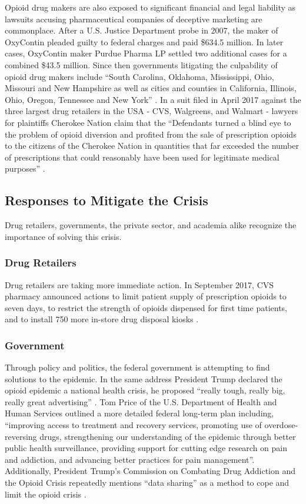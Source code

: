 \documentclass[sigconf]{acmart}
\begin{document}
Opioid drug makers are also exposed to significant financial and legal liability as lawsuits accusing pharmaceutical companies of deceptive marketing are commonplace. After a U.S. Justice Department probe in 2007, the maker of OxyContin pleaded guilty to federal charges and paid \$634.5 million. In later cases, OxyContin maker Purdue Pharma LP settled two additional cases for a combined \$43.5 million. Since then governments litigating the culpability of opioid drug makers include ``South Carolina, Oklahoma, Mississippi, Ohio, Missouri and New Hampshire as well as cities and counties in California, Illinois, Ohio, Oregon, Tennessee and New York'' \cite{opsis11}. In a suit filed in April 2017 against the three largest drug retailers in the USA - CVS, Walgreens, and Walmart - lawyers for plaintiffs Cherokee Nation claim that the ``Defendants turned a blind eye to the problem of opioid diversion and profited from the sale of prescription opioids to the citizens of the Cherokee Nation in quantities that far exceeded the number of prescriptions that could reasonably have been used for legitimate medical purposes'' \cite{opsis5}.

\subsection{Responses to Mitigate the Crisis}
Drug retailers, governments, the private sector, and academia alike recognize the importance of solving this crisis. 

\subsubsection{Drug Retailers}
Drug retailers are taking more immediate action. In September 2017, CVS pharmacy announced actions to limit patient supply of prescription opioids to seven days, to restrict the strength of opioids dispensed for first time patients, and to install 750 more in-store drug disposal kiosks \cite{Charles01} \cite{Hansen01}. 

\subsubsection{Government}
Through policy and politics, the federal government is attempting to find solutions to the epidemic. In the same address President Trump declared the opioid epidemic a national health crisis, he proposed ``really tough, really big, really great advertising'' \cite{opsis6}. Tom Price of the U.S. Department of Health and Human Services outlined a more detailed federal long-term plan including, ``improving access to treatment and recovery services, promoting use of overdose-reversing drugs, strengthening our understanding of the epidemic through better public health surveillance, providing support for cutting edge research on pain and addiction, and advancing better practices for pain management''\cite{opsis7}. Additionally, President Trump's Commission on Combating Drug Addiction and the Opioid Crisis repeatedly mentions ``data sharing'' as a method to cope and limit the opioid crisis \cite{opsis3}.
\end{document}
